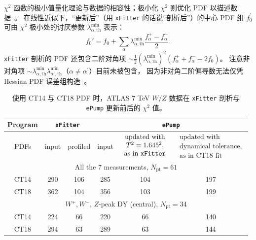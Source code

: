 $\chi^{2}$
函数的极小值量化理论与数据的相容性；极小化 $\chi^{2}$ 则优化 PDF 以描述数据~\cite{Paukkunen:2014zia,Schmidt:2018hvu}。
在线性近似下，``更新后''（用 \texttt{xFitter} 的话说``剖析后''）的中心 PDF 组 $f_{0}^{'}$ 可由 $\chi^{2}$ 极小处的讨厌参数
$\lambda_{\alpha,\textrm{th}}^{\textrm{min}}$ 表示：
\begin{equation}\label{eq:updatePDF}
f_{0}'=f_{0}+\sum_{\alpha} \lambda^{\textrm{min}}_{\alpha,\textrm{th}}\frac{f_{\alpha}^{+}-f_{\alpha}^{-}}{2}.
\end{equation}
\texttt{xFitter} 剖析的 PDF 还包含二阶对角项 \linebreak
$\sim\! \frac{1}{2}(\lambda^{\textrm{min}}_{\alpha,\textrm{th}})^{2}(f_\alpha^{+}+f_\alpha^{-}-2f_0)$。
注意非对角项 $\sim\! \lambda^{\textrm{min}}_{\alpha,\textrm{th}}\lambda^{\textrm{min}}_{\alpha^\prime,\textrm{th}}$（$\alpha\neq \alpha^\prime$）目前未被包含，
因为非对角二阶偏导数无法仅凭 Hessian PDF 误差组构造~\cite{Hou:2016sho}。



 \begin{table}
\centering
\caption{使用 CT14 与 CT18 PDF 时，ATLAS 7 TeV $W/Z$ 数据在 \texttt{xFitter} 剖析与 \texttt{ePump} 更新前后的 $\chi^2$ 值。
}
\label{tab:chi2}
\begin{tabular}{c||c|c||c|c|c}
\hline\hline
Program & \multicolumn{2}{c||}{\texttt{xFitter}} & \multicolumn{3}{c}{\texttt{ePump}} \\
\hline
 PDFs & input & profiled & input &
 $\begin{array}{c}
 \mbox{updated with}\\
 T^2=1.645^2,\\
 \mbox{as in \texttt{xFitter}}
 \end{array}
 $&
 $\begin{array}{c}
 \mbox{updated with}\\
 \mbox{dynamical tolerance,}\\
 \mbox{as in CT18 fit}
 \end{array}
 $
 \\
\hline
\multicolumn{6}{c}{All the 7 measurements, $N_{\textrm{pt}}=61$}\\
\hline
CT14     & 290 & 106  & 285  & 104  &197  \\
CT18     & 362 & 104  & 356  & 103 &  199   \\
\hline
\multicolumn{6}{c}{$W^{+},W^{-}$, $Z$-peak DY (central), $N_{\textrm{pt}}=34$}\\
\hline
CT14     & 224 & 66  & 220  &  66  & 140\\
CT18     & 294 & 63 & 289  &  63 &  144\\
\hline
\hline
\end{tabular}
\end{table}


